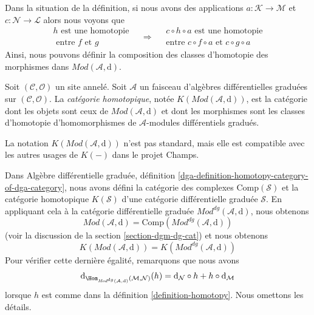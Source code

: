 \noindent
Dans la situation de la définition, si nous avons des
applications $a : \mathcal{K} \to \mathcal{M}$ et $c : \mathcal{N} \to \mathcal{L}$
alors nous voyons
que $$
\begin{matrix}
h\text{ est une homotopie} \\
\text{ entre }f\text{ et } g
\end{matrix}
\quad
\Rightarrow
\quad
\begin{matrix}
c \circ h \circ a\text{ est une homotopie}\\
\text{entre } c
\circ f \circ a\text{ et } c\circ g \circ a
\end{matrix}
$$ Ainsi,
nous pouvons définir la composition des classes d'homotopie des morphismes
dans $\textit{Mod}(\mathcal{A}, \text{d})$.

\begin{definition}
\label{definition-complexes-notation}
Soit $(\mathcal{C}, \mathcal{O})$ un site annelé. Soit
$\mathcal{A}$ un faisceau d'algèbres différentielles graduées
sur $(\mathcal{C}, \mathcal{O})$.
La {\it catégorie homotopique}, notée $K(\textit{Mod}(\mathcal{A}, \text{d}))$, est
la catégorie dont les objets sont ceux de
$\textit{Mod}(\mathcal{A}, \text{d})$ et dont les morphismes sont les classes d'homotopie
d'homomorphismes de $\mathcal{A}$-modules différentiels gradués.
\end{definition}

\noindent
La notation $K(\textit{Mod}(\mathcal{A}, \text{d}))$
n'est pas standard, mais elle
est compatible avec les autres usages de $K(-)$ dans le projet Champs.

\medskip\noindent
Dans Algèbre différentielle graduée, définition
\ref{dga-definition-homotopy-category-of-dga-category},
nous avons défini la catégorie des complexes
$\text{Comp}(\mathcal{S})$ et la catégorie
homotopique $K(\mathcal{S})$ d'une catégorie
différentielle graduée $\mathcal{S}$. En appliquant
cela à la catégorie différentielle graduée
$\textit{Mod}^{dg}(\mathcal{A}, \text{d})$, nous obtenons
$$
\textit{Mod}(\mathcal{A}, \text{d}) =
\text{Comp}(\textit{Mod}^{dg}(\mathcal{A}, \text{d}))
$$ (voir la
discussion de la section \ref{section-dgm-dg-cat}) et nous obtenons
$$
K(\textit{Mod}(\mathcal{A}, \text{d})) =
K(\textit{Mod}^{dg}(\mathcal{A}, \text{d}))
$$
Pour vérifier cette dernière égalité, remarquons que nous avons
$$
\text{d}_{\Hom_{\textit{Mod}^{dg}(\mathcal{A}, \text{d})}
(\mathcal{M}, \mathcal{N})}(h) =
\text{d}_\mathcal{N} \circ h + h \circ \text{d}_\mathcal{M}
$$ lorsque
$h$ est comme dans la définition \ref{definition-homotopy}. Nous omettons les
détails.

